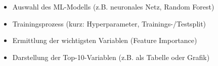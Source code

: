 \begin{itemize}
    \item Auswahl des ML-Modells (z.B. neuronales Netz, Random Forest)
    \item Trainingsprozess (kurz: Hyperparameter, Trainings-/Testsplit)
    \item Ermittlung der wichtigsten Variablen (Feature Importance)
    \item Darstellung der Top-10-Variablen (z.B. als Tabelle oder Grafik)
\end{itemize}
